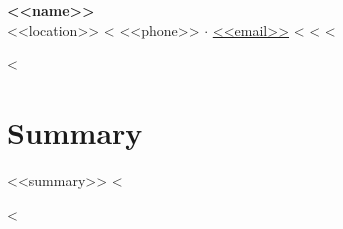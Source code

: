 \documentclass[letterpaper,11pt]{article}
\begin{document}
\begin{center}
    {\LARGE\bfseries <<name>>} \\[4pt]
    \small
    <<location>>
    <%
    <<phone>> $\cdot$
    \href{mailto:<<email>>}{<<email>>}
    <%
    <%
    <%
\end{center}

<%
\section{Summary}
  \small{<<summary>>}
  \vspace{-2pt}
<%

<%
\end{document}
